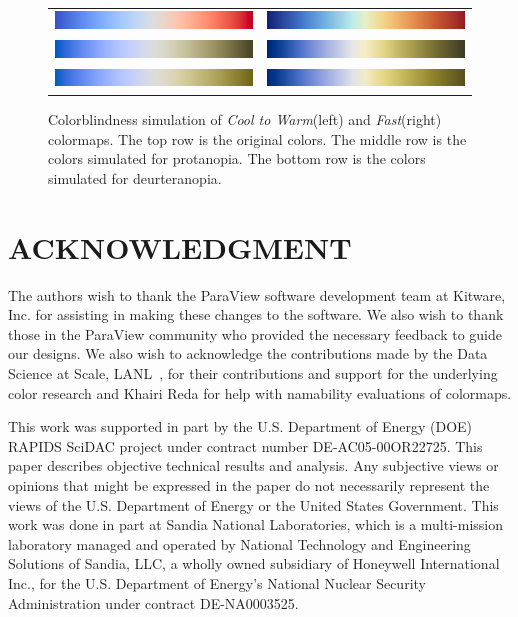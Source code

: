 \documentclass{IEEEcsmag}
\newcommand*{\colormap}[1]{\textsl{#1}\xspace}
\newcommand*{\coolwarm}{\colormap{Cool to Warm}}
\newcommand*{\fast}{\colormap{Fast}}
\begin{document}
\begin{figure}[htb]
  \centering
  \begin{tabular}{cc}
    \includegraphics[width=.44\linewidth, height=5mm]{map-cool-to-warm} & \includegraphics[width=.44\linewidth, height=5mm]{map-fast} \\
    \includegraphics[width=.44\linewidth, height=5mm]{map-protanopia-cool-to-warm} & \includegraphics[width=.44\linewidth, height=5mm]{map-protanopia-fast} \\
    \includegraphics[width=.44\linewidth, height=5mm]{map-deurteranopia-cool-to-warm} & \includegraphics[width=.44\linewidth, height=5mm]{map-deurteranopia-fast}
  \end{tabular}
  \caption{
    Colorblindness simulation of \coolwarm (left) and \fast (right) colormaps.
    The top row is the original colors.
    The middle row is the colors simulated for protanopia.
    The bottom row is the colors simulated for deurteranopia.
  }
  \label{fig:colorblindness}
\end{figure}

\section{ACKNOWLEDGMENT}

The authors wish to thank the ParaView software development team at Kitware, Inc. for assisting in making these changes to the software. We also wish to thank those in the ParaView community who provided the necessary feedback to guide our designs. We also wish to acknowledge the contributions made by the Data Science at Scale, LANL~\cite{SciVisColor}, for their contributions and support for the underlying color research and Khairi Reda for help with namability evaluations of colormaps.

This work was supported in part by the U.S. Department of Energy (DOE) RAPIDS SciDAC project under contract number DE-AC05-00OR22725. This paper describes objective technical results and analysis. Any subjective views or opinions that might be expressed in the paper do not necessarily represent the views of the U.S. Department of Energy or the United States Government. This work was done in part at Sandia National Laboratories, which is a multi-mission laboratory managed and operated by National Technology and Engineering Solutions of Sandia, LLC, a wholly owned subsidiary of Honeywell International Inc., for the U.S. Department of Energy's National Nuclear Security Administration under contract DE-NA0003525.
\end{document}
